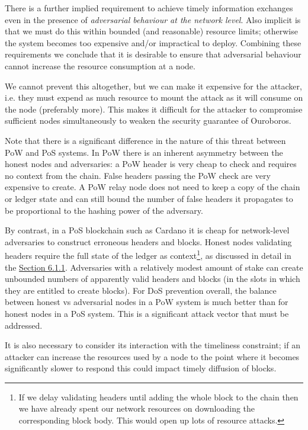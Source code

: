\documentclass[11pt,a4paper]{article}
\begin{document}
There is a further implied requirement to achieve timely information
exchanges even in the presence of \emph{adversarial behaviour at the
network level}. Also implicit is that we must do this within bounded
(and reasonable) resource limits; otherwise the system becomes too
expensive and/or impractical to deploy. Combining these requirements we
conclude that it is desirable to ensure that adversarial behaviour
cannot increase the resource consumption at a node.

We cannot prevent this altogether, but we can make it expensive for the
attacker, i.e. they must expend as much resource to mount the attack as
it will consume on the node (preferably more). This makes it difficult
for the attacker to compromise sufficient nodes simultaneously to weaken
the security guarantee of Ouroboros.

Note that there is a significant difference in the nature of this threat
between PoW and PoS systems. In PoW there is an inherent asymmetry
between the honest nodes and adversaries: a PoW header is very cheap to
check and requires no context from the chain. False headers passing the
PoW check are very expensive to create. A PoW relay node does not need
to keep a copy of the chain or ledger state and can still bound the
number of false headers it propagates to be proportional to the hashing
power of the adversary.

By contrast, in a PoS blockchain such as Cardano it is cheap for
network-level adversaries to construct erroneous headers and blocks.
Honest nodes validating headers require the full state of the ledger as
context\footnote{If we delay validating headers until adding the whole
  block to the chain then we have already spent our network resources on
  downloading the corresponding block body. This would open up lots of
  resource attacks.}, as discussed in detail in the
\protect\hyperlink{interleaving-transmission-and-validation}{{Section
6.1.1}}. Adversaries with a relatively modest amount of stake can create
unbounded numbers of apparently valid headers and blocks (in the slots
in which they are entitled to create blocks). For DoS prevention
overall, the balance between honest vs adversarial nodes in a PoW system
is much better than for honest nodes in a PoS system. This is a
significant attack vector that must be addressed.

It is also necessary to consider its interaction with the timeliness
constraint; if an attacker can increase the resources used by a node to
the point where it becomes significantly slower to respond this could
impact timely diffusion of blocks.
\end{document}
